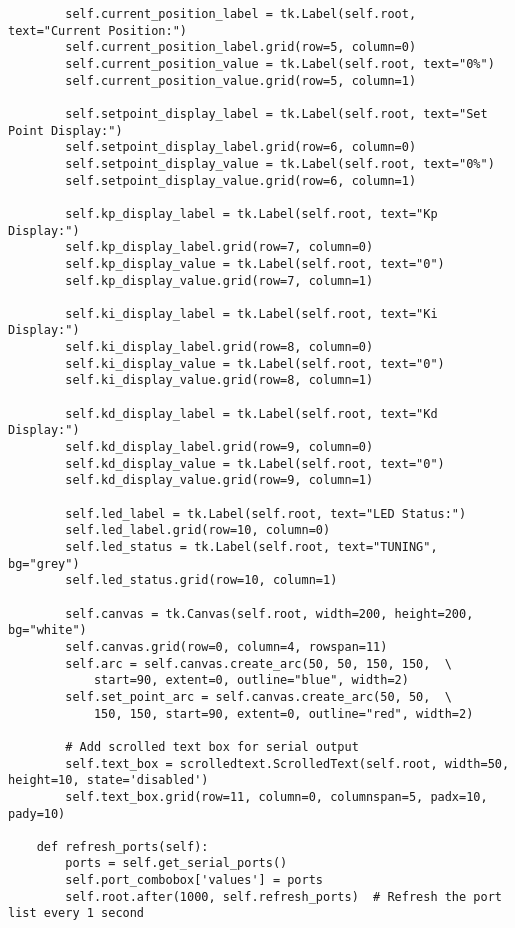 \documentclass{article}
\begin{document}
\begin{verbatim}
        self.current_position_label = tk.Label(self.root, text="Current Position:")
        self.current_position_label.grid(row=5, column=0)
        self.current_position_value = tk.Label(self.root, text="0%")
        self.current_position_value.grid(row=5, column=1)

        self.setpoint_display_label = tk.Label(self.root, text="Set Point Display:")
        self.setpoint_display_label.grid(row=6, column=0)
        self.setpoint_display_value = tk.Label(self.root, text="0%")
        self.setpoint_display_value.grid(row=6, column=1)

        self.kp_display_label = tk.Label(self.root, text="Kp Display:")
        self.kp_display_label.grid(row=7, column=0)
        self.kp_display_value = tk.Label(self.root, text="0")
        self.kp_display_value.grid(row=7, column=1)

        self.ki_display_label = tk.Label(self.root, text="Ki Display:")
        self.ki_display_label.grid(row=8, column=0)
        self.ki_display_value = tk.Label(self.root, text="0")
        self.ki_display_value.grid(row=8, column=1)

        self.kd_display_label = tk.Label(self.root, text="Kd Display:")
        self.kd_display_label.grid(row=9, column=0)
        self.kd_display_value = tk.Label(self.root, text="0")
        self.kd_display_value.grid(row=9, column=1)

        self.led_label = tk.Label(self.root, text="LED Status:")
        self.led_label.grid(row=10, column=0)
        self.led_status = tk.Label(self.root, text="TUNING", bg="grey")
        self.led_status.grid(row=10, column=1)

        self.canvas = tk.Canvas(self.root, width=200, height=200, bg="white")
        self.canvas.grid(row=0, column=4, rowspan=11)
        self.arc = self.canvas.create_arc(50, 50, 150, 150,  \
            start=90, extent=0, outline="blue", width=2)
        self.set_point_arc = self.canvas.create_arc(50, 50,  \
            150, 150, start=90, extent=0, outline="red", width=2)

        # Add scrolled text box for serial output
        self.text_box = scrolledtext.ScrolledText(self.root, width=50, height=10, state='disabled')
        self.text_box.grid(row=11, column=0, columnspan=5, padx=10, pady=10)

    def refresh_ports(self):
        ports = self.get_serial_ports()
        self.port_combobox['values'] = ports
        self.root.after(1000, self.refresh_ports)  # Refresh the port list every 1 second


\end{verbatim}
\end{document}
